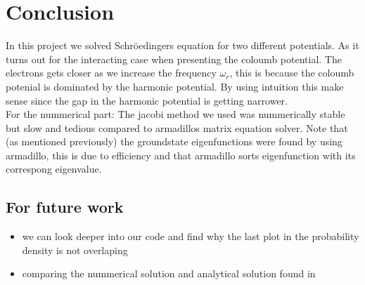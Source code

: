 \documentclass[a4paper, 10pt]{article}
\begin{document}
\section{Conclusion} In this project we solved Schröedingers equation for two different
potentials. As it turns out for the interacting case when presenting the coloumb potential.
The electrons gets closer as we increase the frequency $\omega_{r}$, this is because
the coloumb potenial is dominated by the harmonic potential. By using intuition this make sense
since the gap in the harmonic potential is getting narrower.
\vspace{3mm}
\\
For the nummerical part: The jacobi method we used was nummerically stable but slow and tedious compared to
armadillos matrix equation solver. Note that (as mentioned previously) the groundstate eigenfunctions
were found by using armadillo, this is due to efficiency and that armadillo sorts eigenfunction with its
correspong eigenvalue.
\subsection{For future work}
\begin{itemize}
  \item we can look deeper into our code and find why the last plot
  in the probability density is not overlaping
  \item comparing the nummerical solution and analytical solution found in \cite{taut}
\end{itemize}

\newpage


\end{document}
